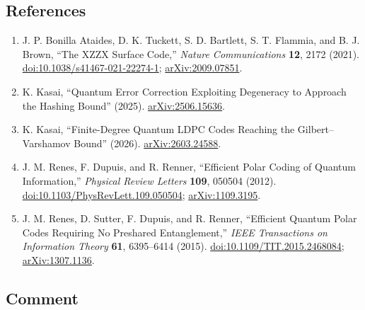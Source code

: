 \subsection*{References}

\begin{enumerate}[label={},leftmargin=4.8em,labelsep=0.5em]
  \footnotesize
  \item[\textup{[BAT+21]}]\label{ref:p6-xzzx}
  J. P. Bonilla Ataides, D. K. Tuckett, S. D. Bartlett, S. T. Flammia, and
  B. J. Brown, ``The XZZX Surface Code,'' \emph{Nature Communications}
  \textbf{12}, 2172 (2021).
  \href{https://doi.org/10.1038/s41467-021-22274-1}{doi:10.1038/s41467-021-22274-1};
  \href{https://arxiv.org/abs/2009.07851}{arXiv:2009.07851}.

  \item[\textup{[Kas25]}]\label{ref:p6-kasai-degeneracy}
  K. Kasai, ``Quantum Error Correction Exploiting Degeneracy to Approach the
  Hashing Bound'' (2025).\newline
  \href{https://arxiv.org/abs/2506.15636}{arXiv:2506.15636}.

  \item[\textup{[Kas26]}]\label{ref:p6-kasai-gv}
  K. Kasai, ``Finite-Degree Quantum LDPC Codes Reaching the
  Gilbert--Varshamov Bound'' (2026).\newline
  \href{https://arxiv.org/abs/2603.24588}{arXiv:2603.24588}.

  \item[\textup{[RDR12]}]\label{ref:p6-renes-2012}
  J. M. Renes, F. Dupuis, and R. Renner,
  ``Efficient Polar Coding of Quantum Information,''
  \emph{Physical Review Letters} \textbf{109}, 050504 (2012).
  \href{https://doi.org/10.1103/PhysRevLett.109.050504}%
       {doi:10.1103/PhysRevLett.109.050504};
  \href{https://arxiv.org/abs/1109.3195}{arXiv:1109.3195}.

  \item[\textup{[RSDR15]}]\label{ref:p6-renes-2015}
  J. M. Renes, D. Sutter, F. Dupuis, and R. Renner,
  ``Efficient Quantum Polar Codes Requiring No Preshared Entanglement,''
  \emph{IEEE Transactions on Information Theory} \textbf{61}, 6395--6414
  (2015).
  \href{https://doi.org/10.1109/TIT.2015.2468084}%
       {doi:10.1109/TIT.2015.2468084};
  \href{https://arxiv.org/abs/1307.1136}{arXiv:1307.1136}.
\end{enumerate}

\subsection*{Comment}

